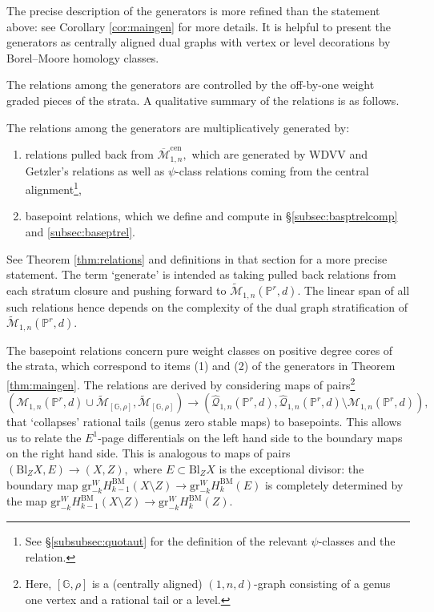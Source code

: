 \documentclass[12pt,reqno]{amsart}
\theoremstyle{definition}
\newenvironment{customthm}[1]
  {\renewcommand\theinnercustomthm{#1}\innercustomthm}
  {\endinnercustomthm}
\theoremstyle{definition}
\theoremstyle{definition}
\theoremstyle{definition}
\newcommand{\PP}{\mathbb{P}}
\newcommand{\Mtil}{\widetilde{\mathcal{M}}}
\newcommand{\gr}{\mathrm{gr}}
\begin{document}
The precise description of the generators is more refined than the statement above: see Corollary \ref{cor:maingen} for more details. It is helpful to present the generators as centrally aligned dual graphs with vertex or level decorations by Borel--Moore homology classes.

The relations among the generators are controlled by the off-by-one weight graded pieces of the strata. A qualitative summary of the relations is as follows. 

\begin{customthm}{B}\label{thm:rels}
  The relations among the generators are multiplicatively generated by:
  \begin{enumerate}
    \item relations pulled back from $\overline{\mathcal{M}}_{1,n}^{\mathrm{cen}},$ which are generated by WDVV and Getzler's relations as well as $\psi$-class relations coming from the central alignment\footnote{See §\ref{subsubsec:quotaut} for the definition of the relevant $\psi$-classes and the relation.},
    \item basepoint relations, which we define and compute in §\ref{subsec:basptrelcomp} and \ref{subsec:baseptrel}.
  \end{enumerate}
\end{customthm}

See Theorem \ref{thm:relations} and definitions in that section for a more precise statement. The term `generate' is intended as taking pulled back relations from each stratum closure and pushing forward to $\Mtil_{1,n}(\PP^r,d)$. The linear span of all such relations hence depends on the complexity of the dual graph stratification of $\Mtil_{1,n}(\PP^r,d).$

The basepoint relations concern pure weight classes on positive degree cores of the strata, which correspond to items (1) and (2) of the generators in Theorem \ref{thm:maingen}. The relations are derived by considering maps of pairs\footnote{Here, $[\mathbb{G},\rho]$ is a (centrally aligned) $(1,n,d)$-graph consisting of a genus one vertex and a rational tail or a level.} $$(\mathcal{M}_{1,n}(\PP^r,d)\cup \Mtil_{[\mathbb{G},\rho]}, \Mtil_{[\mathbb{G},\rho]})\to (\hat{\mathcal{Q}}_{1,n}(\PP^r,d), \hat{\mathcal{Q}}_{1,n}(\PP^r,d)\setminus \mathcal{M}_{1,n}(\PP^r,d)),$$ that `collapses' rational tails (genus zero stable maps) to basepoints. This allows us to relate the $E^1$-page differentials on the left hand side to the boundary maps on the right hand side. This is analogous to maps of pairs $(\mathrm{Bl}_Z X, E)\to (X,Z),$ where $E\subset \mathrm{Bl}_Z X$ is the exceptional divisor: the boundary map $\gr^W_{-k}H^{\mathrm{BM}}_{k-1}(X\setminus Z)\to \gr^W_{-k} H^{\mathrm{BM}}_{k}(E)$ is completely determined by the map $\gr^W_{-k}H^{\mathrm{BM}}_{k-1}(X\setminus Z)\to \gr^W_{-k} H^{\mathrm{BM}}_{k}(Z).$
\end{document}
